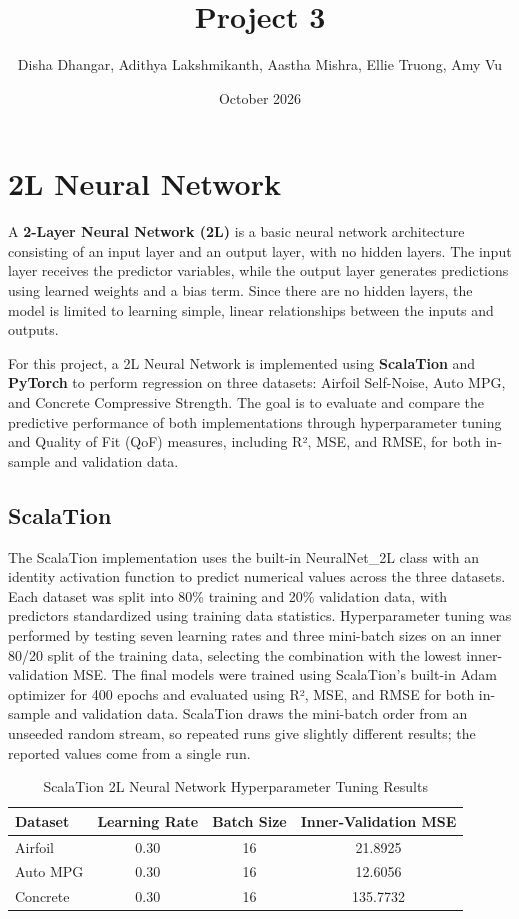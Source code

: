 \documentclass{article}
\title{Project 3}
\author{Disha Dhangar, Adithya Lakshmikanth, Aastha Mishra, Ellie Truong, Amy Vu}
\date{October 2026}
\begin{document}
\maketitle

\section{2L Neural Network}
A \textbf{2-Layer Neural Network (2L)} is a basic neural network architecture consisting of an input layer and an output layer, with no hidden layers. The input layer receives the predictor variables, while the output layer generates predictions using learned weights and a bias term. Since there are no hidden layers, the model is limited to learning simple, linear relationships between the inputs and outputs.
\medskip

For this project, a 2L Neural Network is implemented using \textbf{ScalaTion} and \textbf{PyTorch} to perform regression on three datasets: Airfoil Self-Noise, Auto MPG, and Concrete Compressive Strength. The goal is to evaluate and compare the predictive performance of both implementations through hyperparameter tuning and Quality of Fit (QoF) measures, including R², MSE, and RMSE, for both in-sample and validation data.

\subsection{ScalaTion}
The ScalaTion implementation uses the built-in NeuralNet\_2L class with an identity activation function to predict numerical values across the three datasets. Each dataset was split into 80\% training and 20\% validation data, with predictors standardized using training data statistics. Hyperparameter tuning was performed by testing seven learning rates and three mini-batch sizes on an inner 80/20 split of the training data, selecting the combination with the lowest inner-validation MSE. The final models were trained using ScalaTion's built-in Adam optimizer for 400 epochs and evaluated using R², MSE, and RMSE for both in-sample and validation data. ScalaTion draws the mini-batch order from an unseeded random stream, so repeated runs give slightly different results; the reported values come from a single run.
\medskip
\begin{table}[H]
    \centering
    \caption{ScalaTion 2L Neural Network Hyperparameter Tuning Results}
    \label{tab:scala_hyperparameters}
    \begin{tabular}{lccc}
        \hline
        \textbf{Dataset} & \textbf{Learning Rate} & \textbf{Batch Size} & \textbf{Inner-Validation MSE} \\
        \hline
        Airfoil  & 0.30 & 16 & 21.8925 \\
        Auto MPG & 0.30 & 16 & 12.6056 \\
        Concrete & 0.30 & 16 & 135.7732 \\
        \hline
    \end{tabular}
\end{table}
\end{document}
